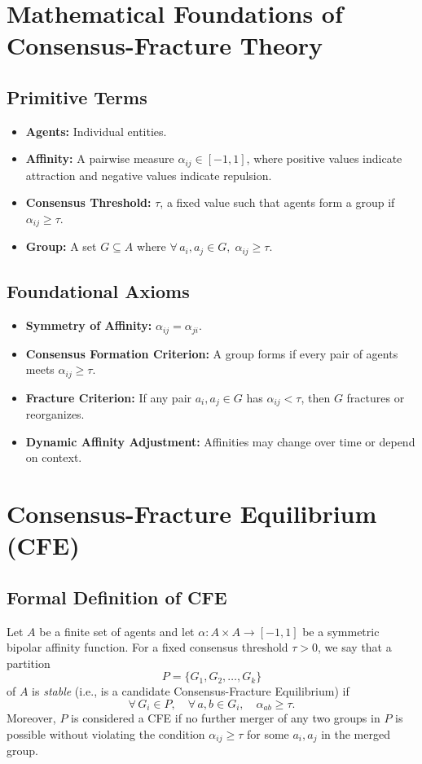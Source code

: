 \documentclass{article}
\begin{document}
\section{Mathematical Foundations of Consensus-Fracture Theory}

\subsection{Primitive Terms}
\begin{itemize}
  \item \textbf{Agents:} Individual entities.
  \item \textbf{Affinity:} A pairwise measure $\alpha_{ij}\in [-1,1]$, where positive values indicate attraction and negative values indicate repulsion.
  \item \textbf{Consensus Threshold:} $\tau$, a fixed value such that agents form a group if $\alpha_{ij} \ge \tau$.
  \item \textbf{Group:} A set $G \subseteq A$ where $\forall\,a_i,a_j\in G,\; \alpha_{ij} \ge \tau$.
\end{itemize}

\subsection{Foundational Axioms}
\begin{itemize}
  \item \textbf{Symmetry of Affinity:} $\alpha_{ij} = \alpha_{ji}$.
  \item \textbf{Consensus Formation Criterion:} A group forms if every pair of agents meets $\alpha_{ij} \ge \tau$.
  \item \textbf{Fracture Criterion:} If any pair $a_i, a_j \in G$ has $\alpha_{ij} < \tau$, then $G$ fractures or reorganizes.
  \item \textbf{Dynamic Affinity Adjustment:} Affinities may change over time or depend on context.
\end{itemize}









\section{Consensus-Fracture Equilibrium (CFE)}

\subsection{Formal Definition of CFE}
Let $A$ be a finite set of agents and let $\alpha : A \times A \to [-1,1]$ be a symmetric bipolar affinity function. For a fixed consensus threshold $\tau > 0$, we say that a partition 
\[
P = \{G_1, G_2, \dots, G_k\}
\]
of $A$ is \emph{stable} (i.e., is a candidate Consensus-Fracture Equilibrium) if
\[
\forall\, G_i \in P,\quad \forall\,a,b \in G_i,\quad \alpha_{ab}\ge \tau.
\]
Moreover, $P$ is considered a CFE if no further merger of any two groups in $P$ is possible without violating the condition $\alpha_{ij} \ge \tau$ for some $a_i, a_j$ in the merged group.
\end{document}
